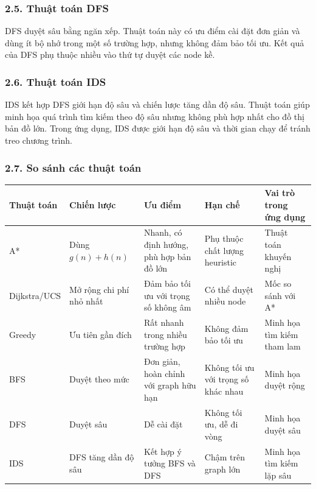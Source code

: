 \documentclass[12pt,a4paper]{article}
\begin{document}
\subsubsection*{2.5. Thuật toán DFS}

DFS duyệt sâu bằng ngăn xếp. Thuật toán này có ưu điểm cài đặt đơn giản và dùng ít bộ nhớ trong một số trường hợp, nhưng không đảm bảo tối ưu. Kết quả của DFS phụ thuộc nhiều vào thứ tự duyệt các node kề.

\subsubsection*{2.6. Thuật toán IDS}

IDS kết hợp DFS giới hạn độ sâu và chiến lược tăng dần độ sâu. Thuật toán giúp minh họa quá trình tìm kiếm theo độ sâu nhưng không phù hợp nhất cho đồ thị bản đồ lớn. Trong ứng dụng, IDS được giới hạn độ sâu và thời gian chạy để tránh treo chương trình.

\subsubsection*{2.7. So sánh các thuật toán}

\begin{longtable}{|p{2.7cm}|p{3cm}|p{3.2cm}|p{2.7cm}|p{3cm}|}
\hline
\textbf{Thuật toán} & \textbf{Chiến lược} & \textbf{Ưu điểm} & \textbf{Hạn chế} & \textbf{Vai trò trong ứng dụng}\\
\hline
A* & Dùng $g(n)+h(n)$ & Nhanh, có định hướng, phù hợp bản đồ lớn & Phụ thuộc chất lượng heuristic & Thuật toán khuyến nghị\\
\hline
Dijkstra/UCS & Mở rộng chi phí nhỏ nhất & Đảm bảo tối ưu với trọng số không âm & Có thể duyệt nhiều node & Mốc so sánh với A*\\
\hline
Greedy & Ưu tiên gần đích & Rất nhanh trong nhiều trường hợp & Không đảm bảo tối ưu & Minh họa tìm kiếm tham lam\\
\hline
BFS & Duyệt theo mức & Đơn giản, hoàn chỉnh với graph hữu hạn & Không tối ưu với trọng số khác nhau & Minh họa duyệt rộng\\
\hline
DFS & Duyệt sâu & Dễ cài đặt & Không tối ưu, dễ đi vòng & Minh họa duyệt sâu\\
\hline
IDS & DFS tăng dần độ sâu & Kết hợp ý tưởng BFS và DFS & Chậm trên graph lớn & Minh họa tìm kiếm lặp sâu\\
\hline
\end{longtable}
\end{document}
